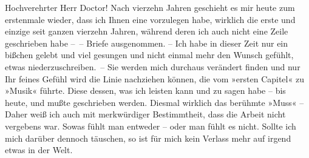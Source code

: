 \pstart{}Hochverehrter Herr Doctor!\pend\vspace{0.5em}
\pstart
           Nach vierzehn Jahren geschieht es mir heute zum erstenmale wieder, dass
               ich Ihnen eine \label{K_L03730-1v}\label{K_L03730-1}
               vorzulegen habe, wirklich die erste und einzige seit ganzen vierzehn Jahren, während
               deren ich auch nicht eine Zeile geschrieben habe – – Briefe ausgenommen. – Ich
               habe in dieser Zeit nur ein bißchen gelebt und viel gesungen und nicht einmal mehr
               den Wunsch gefühlt, etwas niederzuschreiben. – Sie werden mich durchaus
               verändert finden und nur Ihr feines Gefühl wird die Linie nachziehen können, die vom
               »ersten Capitel« zu »Musik« führte. Diese \label{K_L03730-2v}\label{K_L03730-2} dessen, was ich leisten kann und zu
               sagen habe – bis heute, und mußte geschrieben werden. Diesmal wirklich das berühmte
               »Muss« – Daher weiß ich auch mit merkwürdiger Bestimmtheit, dass die Arbeit nicht vergebens war. Sowas fühlt
               man entweder – oder man fühlt es nicht. Sollte ich mich darüber dennoch täuschen, so
               ist für mich kein Verlass mehr auf irgend etwas in der Welt.\pend
           
